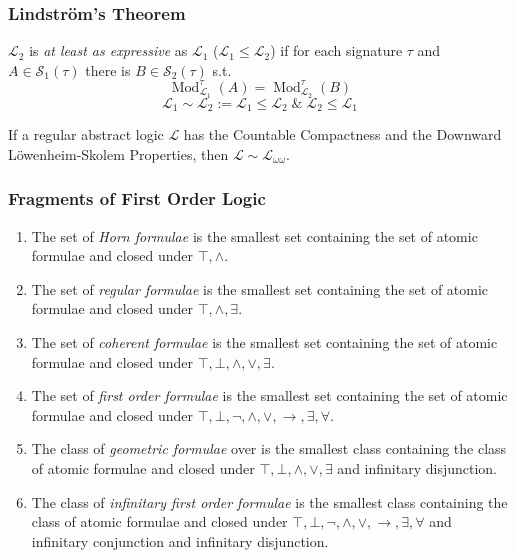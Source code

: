 \documentclass[UTF8,aspectratio=43,11pt,colorlinks,compress,openany]{beamer}%
\begin{document}
\begin{frame}\frametitle{Lindstr\"om's Theorem}
	\begin{definition}
		$\mathcal{L}_2$ is \emph{at least as expressive} as $\mathcal{L}_1$ ($\mathcal{L}_1\leq \mathcal{L}_2$) if for each signature $\tau$ and $A\in \mathcal{S}_1(\tau)$ there is $B\in \mathcal{S}_2(\tau)$ s.t.
		\[\operatorname{Mod}_{\mathcal{L}_1}^\tau(A)=\operatorname{Mod}_{\mathcal{L}_2}^\tau(B)\]
		\[\mathcal{L}_1\sim\mathcal{L}_2:=\mathcal{L}_1\leq\mathcal{L}_2\;\&\;\mathcal{L}_2\leq\mathcal{L}_1\]
	\end{definition}
	\begin{theorem}
		If a regular abstract logic $\mathcal{L}$ has the Countable Compactness and the Downward L\"owenheim-Skolem Properties, then $\mathcal{L}\sim\mathcal{L}_{\omega\omega}$.
	\end{theorem}
\end{frame}

\begin{frame}\frametitle{Fragments of First Order Logic}
\begin{enumerate}
	\item The set of \emph{Horn formulae} is the smallest set containing the set of atomic formulae and closed under $\top,\wedge$.
	\item The set of \emph{regular formulae} is the smallest set containing the set of atomic formulae and closed under $\top,\wedge,\exists$.
	\item The set of \emph{coherent formulae} is the smallest set containing the set of atomic formulae and closed under $\top,\bot,\wedge,\vee,\exists$.
	\item The set of \emph{first order formulae} is the smallest set containing the set of atomic formulae and closed under $\top,\bot,\neg,\wedge,\vee,\to,\exists,\forall$.
	\item The class of \emph{geometric formulae} over is the smallest class containing the class of atomic formulae and closed under $\top,\bot,\wedge,\vee,\exists$ and infinitary disjunction.
	\item The class of \emph{infinitary first order formulae} is the smallest class containing the class of atomic formulae and closed under $\top,\bot,\neg,\wedge,\vee,\to,\exists,\forall$ and infinitary conjunction and infinitary disjunction.
\end{enumerate}
\end{frame}
\end{document}
